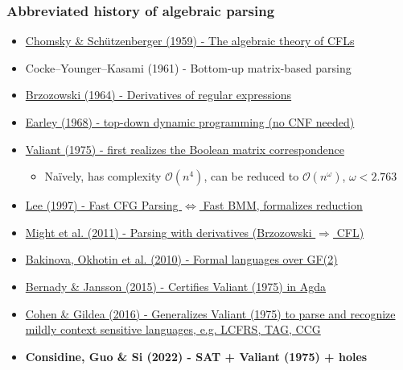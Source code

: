 \documentclass{beamer}
\begin{document}
    \begin{frame}
        \frametitle{Abbreviated history of algebraic parsing}
        \begin{itemize}
            \item \href{http://www-igm.univ-mlv.fr/~berstel/Mps/Travaux/A/1963-7ChomskyAlgebraic.pdf}{Chomsky \& Sch\"utzenberger (1959) - The algebraic theory of CFLs}
            \item Cocke–Younger–Kasami (1961) - Bottom-up matrix-based parsing
            \item \href{https://dl.acm.org/doi/10.1145/321239.321249}{Brzozowski (1964) - Derivatives of regular expressions}
            \item \href{https://dl.acm.org/doi/10.1145/362007.362035}{Earley (1968) - top-down dynamic programming (no CNF needed)}
            \item \href{http://theory.stanford.edu/~virgi/cs367/papers/valiantcfg.pdf}{Valiant (1975) - first realizes the Boolean matrix correspondence}
            \begin{itemize}
                \item Na\"ively, has complexity $\mathcal{O}(n^4)$, can be reduced to $\mathcal{O}(n^\omega)$, $\omega < 2.763$
            \end{itemize}
            \item \href{https://www.cs.cornell.edu/home/llee/papers/bmmcfl-jacm.pdf}{Lee (1997) - Fast CFG Parsing $\Longleftrightarrow$ Fast BMM, formalizes reduction}
            \item \href{https://matt.might.net/papers/might2011derivatives.pdf}{Might et al. (2011) - Parsing with derivatives (Brzozowski $\Rightarrow$ CFL)}
            \item \href{https://users.math-cs.spbu.ru/~okhotin/papers/formal_languages_gf2.pdf}{Bakinova, Okhotin et al. (2010) - Formal languages over GF(2)}
            \item \href{https://arxiv.org/pdf/1601.07724.pdf}{Bernady \& Jansson (2015) - Certifies Valiant (1975) in Agda}
            \item \href{https://arxiv.org/pdf/1504.08342.pdf}{Cohen \& Gildea (2016) - Generalizes Valiant (1975) to parse and recognize mildly context sensitive languages, e.g. LCFRS, TAG, CCG}
            \item \textbf{Considine, Guo \& Si (2022) - SAT + Valiant (1975) + holes}
        \end{itemize}
    \end{frame}
\end{document}
